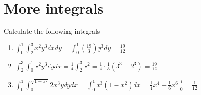 \documentclass[12pt]{article}
\begin{document}
\section{More integrals}
Calculate the following integrals
\begin{enumerate}
    \item $\int_0^1 \int_2^3 x^2 y^3 dxdy = \int_0^1 \left(\frac{19}{3}\right)y^3 dy = \frac{19}{12}$
    \item $\int_2^3 \int_0^1 x^2y^3 dydx = \frac{1}{4} \int_2^3 x^2 = \frac{1}{4} \cdot \frac{1}{3}(3^3-2^3)= \frac{19}{12}$
    \item $\int_0^1 \int_0^{\sqrt{1-x^2}}2x^3y dydx = \int_0^1 x^3(1-x^2)dx= \frac{1}{4}x^4- \frac{1}{6}x^6\bigg|_0^1 = \frac{1}{12}$
\end{enumerate}
\end{document}
